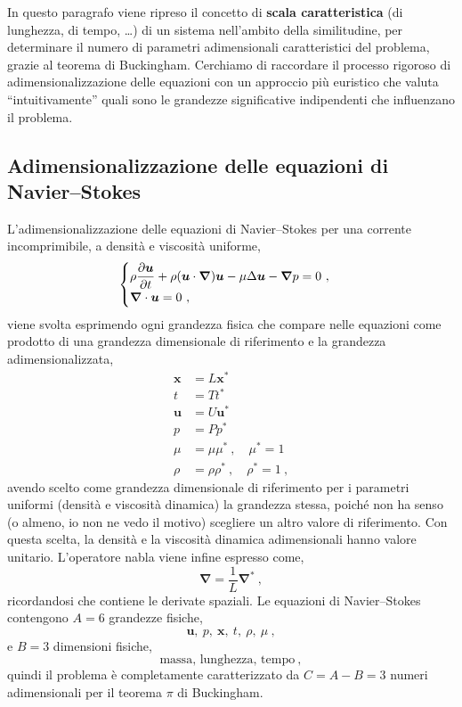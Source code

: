
In questo paragrafo viene ripreso il concetto di \textbf{scala caratteristica} (di lunghezza, di tempo, \dots) di un sistema nell'ambito della similitudine, per determinare il numero di parametri adimensionali caratteristici del problema, grazie al teorema di Buckingham.
Cerchiamo di raccordare il processo rigoroso di adimensionalizzazione delle equazioni con un approccio più euristico che valuta ``intuitivamente'' quali sono le grandezze significative indipendenti che influenzano il problema.

\subsection{Adimensionalizzazione delle equazioni di Navier--Stokes}
L'adimensionalizzazione delle equazioni di Navier--Stokes per una corrente incomprimibile, a densità e viscosità uniforme,
\begin{equation}
\begin{cases}
 \rho\dfrac{\partial{\bm{u}}}{\partial{t}} + \rho ( \bm{u} \cdot \bm{\nabla} ) \bm{u} 
 - \mu\Delta \bm{u} - \bm{\nabla} p = 0 \ , \\
 \bm{\nabla} \cdot \bm{u} = 0 \ ,
\end{cases}
\end{equation}
viene svolta esprimendo ogni grandezza fisica che compare nelle equazioni come prodotto di una grandezza dimensionale di riferimento e la grandezza adimensionalizzata,
\begin{equation}
\begin{aligned}
 \bm{x} & = L \bm{x}^* \\  
     t  & = T    {t}^* \\
 \bm{u} & = U \bm{u}^* \\
     p  & = P    {p}^* \\
 \mu    & = \mu  \mu^* \ , \quad  \mu^* = 1 \\
 \rho   & = \rho\rho^* \ , \quad \rho^* = 1 \ ,
\end{aligned}
\end{equation}
avendo scelto come grandezza dimensionale di riferimento per i parametri uniformi (densità e viscosità dinamica) la grandezza stessa, poiché non ha senso (o almeno, io non ne vedo il motivo) scegliere un altro valore di riferimento. Con questa scelta, la densità e la viscosità dinamica adimensionali hanno valore unitario.
L'operatore nabla viene infine espresso come,
\begin{equation}
 \bm{\nabla} = \dfrac{1}{L} \bm{\nabla}^* \ ,
\end{equation}
ricordandosi che contiene le derivate spaziali. Le equazioni di Navier--Stokes contengono $A=6$ grandezze fisiche,
\begin{equation}
 \bm{u}, \ p, \ \bm{x}, \ t, \ \rho, \ \mu \ ,
\end{equation}
e $B=3$ dimensioni fisiche,
\begin{equation}
 \text{massa, lunghezza, tempo} \ ,
\end{equation}
quindi il problema è completamente caratterizzato da $C=A-B = 3$ numeri adimensionali per il teorema $\pi$ di Buckingham.

